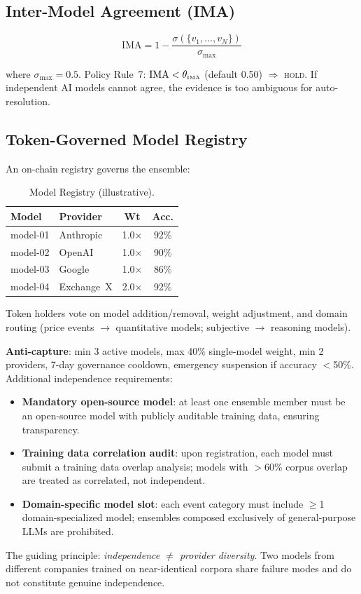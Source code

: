 \documentclass[11pt,a4paper,twocolumn]{article}
\begin{document}
\subsection{Inter-Model Agreement (IMA)}

\begin{equation}
    \text{IMA} = 1 - \frac{\sigma(\{v_1, \ldots, v_N\})}{\sigma_{\max}}
    \label{eq:ima}
\end{equation}

where $\sigma_{\max} = 0.5$. Policy Rule~7: $\text{IMA} < \theta_{\text{\tiny IMA}}$ (default 0.50) $\Rightarrow$ \textsc{hold}. If independent AI models cannot agree, the evidence is too ambiguous for auto-resolution.

\subsection{Token-Governed Model Registry}

An on-chain registry governs the ensemble:

\begin{table}[H]
\centering
\caption{Model Registry (illustrative).}
\label{tab:registry}
\scriptsize
\begin{tabularx}{\columnwidth}{@{}lXcc@{}}
\toprule
\textbf{Model} & \textbf{Provider} & \textbf{Wt} & \textbf{Acc.} \\
\midrule
model-01 & Anthropic & 1.0$\times$ & 92\% \\
model-02 & OpenAI & 1.0$\times$ & 90\% \\
model-03 & Google & 1.0$\times$ & 86\% \\
model-04 & Exchange~X & 2.0$\times$ & 92\% \\
\bottomrule
\end{tabularx}
\end{table}

Token holders vote on model addition/removal, weight adjustment, and domain routing (price events $\to$ quantitative models; subjective $\to$ reasoning models).

\textbf{Anti-capture}: min 3 active models, max 40\% single-model weight, min 2 providers, 7-day governance cooldown, emergency suspension if accuracy $<$50\%. Additional independence requirements:
\begin{itemize}[nosep]
    \item \textbf{Mandatory open-source model}: at least one ensemble member must be an open-source model with publicly auditable training data, ensuring transparency.
    \item \textbf{Training data correlation audit}: upon registration, each model must submit a training data overlap analysis; models with $>$60\% corpus overlap are treated as correlated, not independent.
    \item \textbf{Domain-specific model slot}: each event category must include $\geq$1 domain-specialized model; ensembles composed exclusively of general-purpose LLMs are prohibited.
\end{itemize}
\noindent The guiding principle: \emph{independence $\neq$ provider diversity}. Two models from different companies trained on near-identical corpora share failure modes and do not constitute genuine independence.
\end{document}
